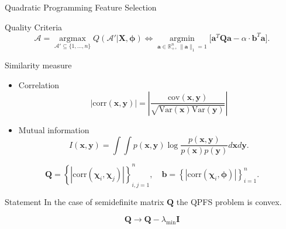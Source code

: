 \documentclass[9pt]{beamer}
\newcommand{\bx}{\mathbf{x}}
\newcommand{\by}{\mathbf{y}}
\newcommand{\ba}{\mathbf{a}}
\newcommand{\bb}{\mathbf{b}}
\newcommand{\bX}{\mathbf{X}}
\newcommand{\bQ}{\mathbf{Q}}
\newcommand{\bbR}{\mathbb{R}}
\newcommand{\cA}{\mathcal{A}}
\newcommand{\bchi}{\boldsymbol{\chi}}
\newcommand{\bphi}{\boldsymbol{\phi}}
\newcommand{\argmin}{\mathop{\arg \min}\limits}
\newcommand{\argmax}{\mathop{\arg \max}\limits}
\begin{document}
\begin{frame}{Quadratic Programming Feature Selection}
	
	\begin{block}{Quality Criteria}
		\[
		\cA = \argmax_{\cA' \subseteq \{1, \dots, n\}} Q(\cA' | \bX, \bphi) \Leftrightarrow \argmin_{\ba  \in \bbR^n_+, \, \|\ba\|_1=1} \bigl[\ba^{T} \bQ \ba - \alpha \cdot \mathbf{b}^{T} \ba \bigr].
		\]
		\vspace{-0.5cm}
	\end{block}
	\begin{block}{Similarity measure}
		\begin{itemize}
			\item Correlation
			\vspace{-0.1cm}
			\[
			\left|\text{corr}(\bx, \by)\right| = \left| \frac{\mathrm{cov}(\bx, \by)}{\sqrt{\mathrm{Var}(\bx) \mathrm{Var}(\by)}} \right|
			\]
			\vspace{-0.3cm}
			\item Mutual information
			\vspace{-0.1cm}
			\[
			I(\bx, \by) = \int \int p(\bx, \by) \log \frac{p(\bx, \by)}{p(\bx) p(\by)} d\bx d\by.
			\]
			\vspace{-0.5cm}
		\end{itemize}
	\end{block}
	\[
	\bQ = \left\{\left|\text{corr}(\bchi_i, \bchi_j)\right|\right\}_{i,j=1}^n, \quad \bb = \left\{\left|\text{corr}(\bchi_i, \bphi)\right|\right\}_{i=1}^n.
	\]
	\vspace{-0.5cm}
	\begin{block}{Statement}
		In the case of semidefinite matrix $\bQ$ the QPFS problem is convex.
	\end{block}
	\begin{equation*}
	\bQ \rightarrow \bQ - \lambda_{\min} \mathbf{I}	
	\end{equation*}
\end{frame}
\end{document}
